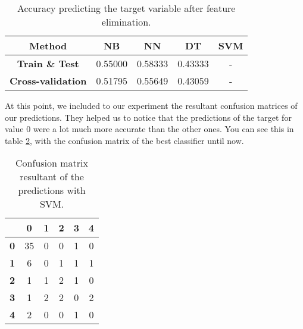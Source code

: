 \begin{table}[hbtp]
    \centering
    \begin{tabular}{c c c c c}
        \toprule
        \textbf{Method} & \textbf{NB} & \textbf{NN} & \textbf{DT} & \textbf{SVM} \\ \midrule
        \textbf{Train \& Test} & 0.55000 & 0.58333 & 0.43333 & - \\
        \textbf{Cross-validation} & 0.51795 & 0.55649 & 0.43059 & - \\
        \bottomrule
    \end{tabular}
    \caption{Accuracy predicting the target variable after feature elimination.}
    \label{tab:first_exp_fe}
\end{table}

At this point, we included to our experiment the resultant confusion matrices of our predictions. They helped us to notice that the predictions of the target for value 0 were a lot much more accurate than the other ones. You can see this in table \ref{tab:first_exp_cm}, with the confusion matrix of the best classifier until now. 

\begin{table}[hbtp]
    \centering
    \begin{tabular}{c c c c c c}
        \toprule
         & \textbf{0} & \textbf{1} & \textbf{2} & \textbf{3} & \textbf{4} \\ \midrule
        \textbf{0} & 35 & 0 & 0 & 1 & 0 \\
        \textbf{1} & 6 & 0 & 1 & 1 & 1 \\
        \textbf{2} & 1 & 1 & 2 & 1 & 0 \\
        \textbf{3} & 1 & 2 & 2 & 0 & 2 \\
        \textbf{4} & 2 & 0 & 0 & 1 & 0 \\
        \bottomrule
    \end{tabular}
    \caption{Confusion matrix resultant of the predictions with SVM.}
    \label{tab:first_exp_cm}
\end{table}

